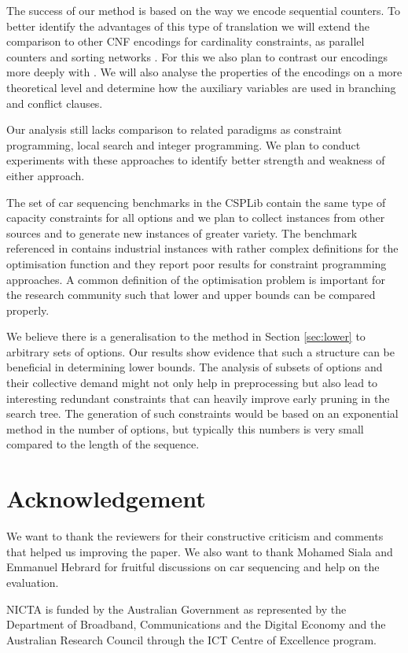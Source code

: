 \documentclass[]{llncs}
\begin{document}
The success of our method is based on the way we encode sequential counters. To better identify the advantages of this
type of translation we will extend the comparison to other CNF encodings for cardinality constraints, as parallel
counters and sorting networks \cite{Sinz05}\cite{Een06}. For this we also plan to contrast our encodings more deeply
with \cite{Bacchus07}. We will also analyse the properties of the encodings on a more theoretical level and determine
how the auxiliary variables are used in branching and conflict clauses. 

Our analysis still lacks comparison to related paradigms as constraint programming, local search and integer
programming.  We plan to conduct experiments with these approaches to identify better strength and weakness of either
approach.

The set of car sequencing benchmarks in the CSPLib contain the same type of capacity constraints for all options and we
plan to collect instances from other sources and to generate new instances of greater variety. The benchmark referenced
in \cite{Solnon08} contains industrial instances with rather complex definitions for the optimisation function and they
report poor results for constraint programming approaches. A common definition of the optimisation problem is important
for the research community such that lower and upper bounds can be compared properly. 

We believe there is a generalisation to the method in Section \ref{sec:lower} to arbitrary sets of options. Our results
show evidence that such a structure can be beneficial in determining lower bounds. The analysis of subsets of options
and their collective demand might not only help in preprocessing but also lead to interesting redundant constraints that
can heavily improve early pruning in the search tree. The generation of such constraints would be based on an
exponential method in the number of options, but typically this numbers is very small compared to the length of the
sequence. 

\section*{Acknowledgement}

We want to thank the reviewers for their constructive criticism and comments that helped us improving the paper.  We
also want to thank Mohamed Siala and Emmanuel Hebrard for fruitful discussions on car sequencing and help on the
evaluation. 

NICTA is funded by the Australian Government as represented by the Department of Broadband, Communications and the
Digital Economy and the Australian Research Council through the ICT Centre of Excellence program.

\newpage 



\end{document}
